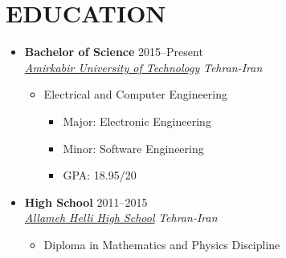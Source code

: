 \section{EDUCATION}
\begin{itemize}
	\item \textbf{Bachelor of Science} \hfill 2015--Present \\
	\href{http://aut.ac.ir/aut/}{ \emph{Amirkabir University of Technology}} \hfill \emph{Tehran-Iran}
	\begin{itemize}
		\item Electrical and Computer Engineering
		\begin{itemize}		
		\item Major: Electronic Engineering \hspace{10 pt}  
		\item Minor: Software Engineering \hspace{10 pt}  
		\item GPA: 18.95/20
		\end{itemize}
	\end{itemize}
\end{itemize}

\vspace{+1 em}
\begin{itemize}
	\item \textbf{High School} \hfill 2011--2015 \\
	\href{https://www.linkedin.com/school/hellischool/}{ \emph{Allameh Helli High School}} \hfill \emph{Tehran-Iran}

	\begin{itemize}
		\item Diploma in Mathematics and Physics Discipline
	\end{itemize}

\end{itemize}


